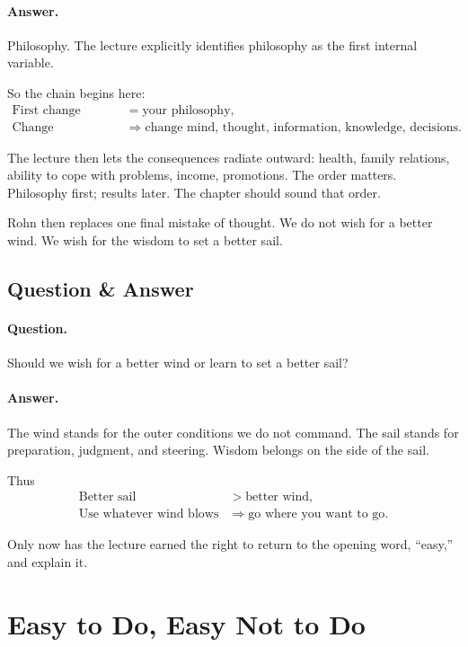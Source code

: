 \paragraph{Answer.} Philosophy. The lecture explicitly identifies philosophy as the first internal variable.

So the chain begins here:
\begin{align}
\text{First change} &= \text{your philosophy},\\
\text{Change philosophy}
&\Longrightarrow
\text{change mind, thought, information, knowledge, decisions}.
\end{align}

The lecture then lets the consequences radiate outward: health, family relations, ability to cope with problems, income, promotions. The order matters. Philosophy first; results later. The chapter should sound that order.

Rohn then replaces one final mistake of thought. We do not wish for a better wind. We wish for the wisdom to set a better sail.

\subsection{Question \& Answer}

\paragraph{Question.} Should we wish for a better wind or learn to set a better sail?

\paragraph{Answer.} The wind stands for the outer conditions we do not command. The sail stands for preparation, judgment, and steering. Wisdom belongs on the side of the sail.

Thus
\begin{align}
\text{Better sail} &> \text{better wind},\\
\text{Use whatever wind blows} &\Longrightarrow \text{go where you want to go}.
\end{align}

Only now has the lecture earned the right to return to the opening word, ``easy,'' and explain it.

\section{Easy to Do, Easy Not to Do}

